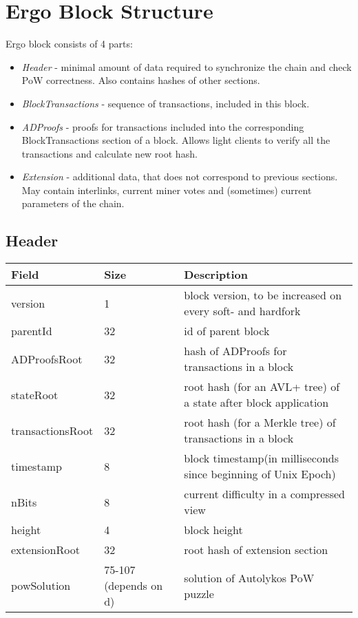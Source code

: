 \section{Ergo Block Structure}
Ergo block consists of 4 parts:

\begin{itemize}
    \item{\em Header } - minimal amount of data required to synchronize the chain and check PoW correctness.
    Also contains hashes of other sections.
    \item{\em BlockTransactions } - sequence of transactions, included in this block.
    \item{\em ADProofs } - proofs for transactions included into the corresponding BlockTransactions section of a block.
    Allows light clients to verify all the transactions and calculate new root hash.
    \item{\em Extension } - additional data, that does not correspond to previous sections.
    May contain interlinks, current miner votes and (sometimes) current parameters of the chain.
\end{itemize}

\subsection{Header}
\vspace{1em}
\begin{tabular}{ |p{2.5cm}||p{0.5cm}|p{7.5cm}|  }
    \hline
    \hline
    Field & Size & Description  \\
    \hline
    version  &  1 &  block version, to be increased on every soft- and hardfork  \\
    \hline
    parentId &  32 &  id of parent block  \\
    \hline
    ADProofsRoot &  32 &  hash of ADProofs for transactions in a block \\
    \hline
    stateRoot &  32 &  root hash (for an AVL+ tree) of a state after block application  \\
    \hline
    transactionsRoot  &  32 &  root hash (for a Merkle tree) of transactions in a block  \\
    \hline
    timestamp &  8 &  block timestamp(in milliseconds since beginning of Unix Epoch)  \\
    \hline
    nBits &  8 & current difficulty in a compressed view  \\
    \hline
    height &  4 & block height  \\
    \hline
    extensionRoot & 32 & root hash of extension section  \\
    \hline
    powSolution & 75-107 (depends on d) & solution of Autolykos PoW puzzle  \\
    \hline
\end{tabular}

